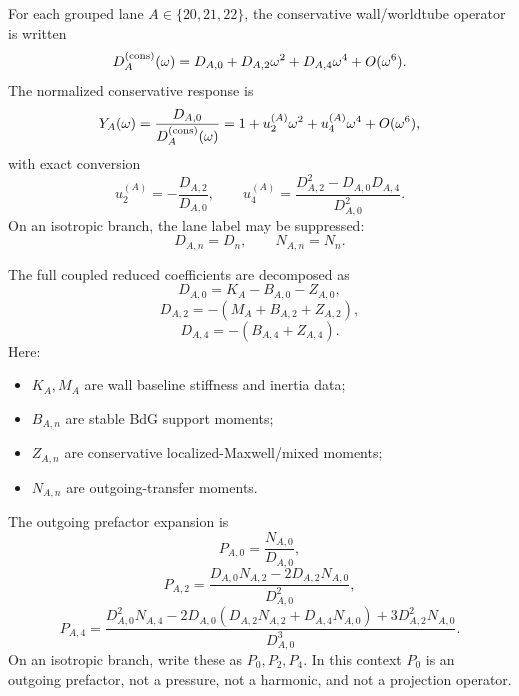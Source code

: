 For each grouped lane \(A\in\{20,21,22\}\), the conservative wall/worldtube operator is written
\begin{equation}
  D_A^{\rm(cons)}(\omega)
  =
  D_{A,0}+D_{A,2}\omega^2+D_{A,4}\omega^4+O(\omega^6).
\end{equation}
The normalized conservative response is
\begin{equation}
  Y_A(\omega)
  =
  \frac{D_{A,0}}{D_A^{\rm(cons)}(\omega)}
  =
  1+u_2^{(A)}\omega^2+u_4^{(A)}\omega^4+O(\omega^6),
\end{equation}
with exact conversion
\begin{equation}
  u_2^{(A)}=-\frac{D_{A,2}}{D_{A,0}},
  \qquad
  u_4^{(A)}=\frac{D_{A,2}^2-D_{A,0}D_{A,4}}{D_{A,0}^2}.
\end{equation}
On an isotropic branch, the lane label may be suppressed:
\begin{equation}
  D_{A,n}=D_n,
  \qquad
  N_{A,n}=N_n.
\end{equation}

The full coupled reduced coefficients are decomposed as
\begin{equation}
  D_{A,0}=K_A-B_{A,0}-Z_{A,0},
\end{equation}
\begin{equation}
  D_{A,2}=-(M_A+B_{A,2}+Z_{A,2}),
\end{equation}
\begin{equation}
  D_{A,4}=-(B_{A,4}+Z_{A,4}).
\end{equation}
Here:
\begin{itemize}[leftmargin=2.2em]
  \item \(K_A,M_A\) are wall baseline stiffness and inertia data;
  \item \(B_{A,n}\) are stable BdG support moments;
  \item \(Z_{A,n}\) are conservative localized-Maxwell/mixed moments;
  \item \(N_{A,n}\) are outgoing-transfer moments.
\end{itemize}

The outgoing prefactor expansion is
\begin{equation}
  P_{A,0}=\frac{N_{A,0}}{D_{A,0}},
\end{equation}
\begin{equation}
  P_{A,2}=\frac{D_{A,0}N_{A,2}-2D_{A,2}N_{A,0}}{D_{A,0}^2},
\end{equation}
\begin{equation}
  P_{A,4}=\frac{D_{A,0}^2N_{A,4}-2D_{A,0}(D_{A,2}N_{A,2}+D_{A,4}N_{A,0})+3D_{A,2}^2N_{A,0}}{D_{A,0}^3}.
\end{equation}
On an isotropic branch, write these as \(P_0,P_2,P_4\).  In this context \(P_0\) is an outgoing prefactor, not a pressure, not a harmonic, and not a projection operator.


